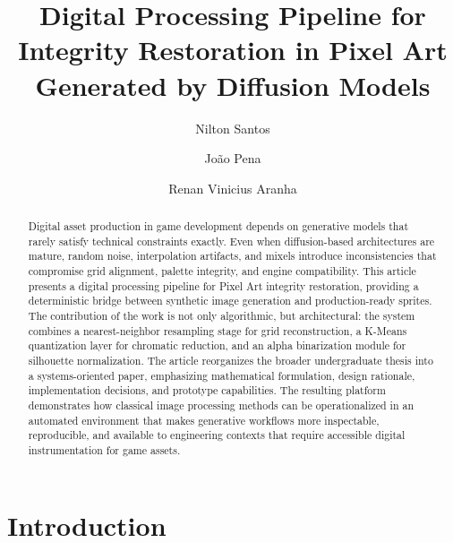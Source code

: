 \documentclass[runningheads]{llncs}
\begin{document}
%
\title{Digital Processing Pipeline for Integrity Restoration in Pixel Art Generated by Diffusion Models}
%
%
\author{Nilton Santos \and
João Pena \and
Renan Vinicius Aranha}
%
%
%
\maketitle              %
%
\begin{abstract}
Digital asset production in game development depends on generative models that rarely satisfy technical constraints exactly. Even when diffusion-based architectures are mature, random noise, interpolation artifacts, and mixels introduce inconsistencies that compromise grid alignment, palette integrity, and engine compatibility. This article presents a digital processing pipeline for Pixel Art integrity restoration, providing a deterministic bridge between synthetic image generation and production-ready sprites. The contribution of the work is not only algorithmic, but architectural: the system combines a nearest-neighbor resampling stage for grid reconstruction, a K-Means quantization layer for chromatic reduction, and an alpha binarization module for silhouette normalization. The article reorganizes the broader undergraduate thesis into a systems-oriented paper, emphasizing mathematical formulation, design rationale, implementation decisions, and prototype capabilities. The resulting platform demonstrates how classical image processing methods can be operationalized in an automated environment that makes generative workflows more inspectable, reproducible, and available to engineering contexts that require accessible digital instrumentation for game assets.

\end{abstract}
%
%
%
\section{Introduction}
\end{document}
